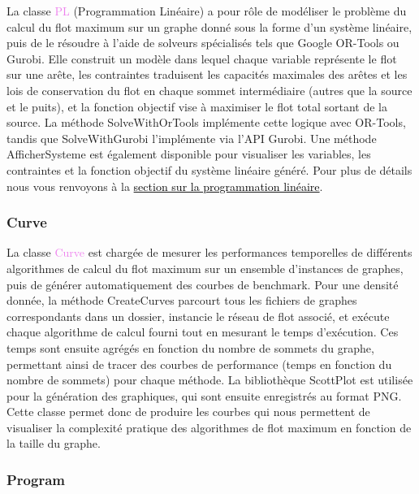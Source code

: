 \documentclass[a4paper]{article}
\begin{document}
La classe \textcolor{violet}{PL} (Programmation Linéaire) a pour rôle de modéliser le problème du calcul du flot maximum sur un graphe donné sous la forme d’un système linéaire, puis de le résoudre à l’aide de solveurs spécialisés tels que Google OR-Tools ou Gurobi. Elle construit un modèle dans lequel chaque variable représente le flot sur une arête, les contraintes traduisent les capacités maximales des arêtes et les lois de conservation du flot en chaque sommet intermédiaire (autres que la source et le puits), et la fonction objectif vise à maximiser le flot total sortant de la source. La méthode \textcolor{green!60!black}{SolveWithOrTools} implémente cette logique avec OR-Tools, tandis que \textcolor{green!60!black}{SolveWithGurobi} l’implémente via l’API Gurobi. Une méthode \textcolor{green!60!black}{AfficherSysteme} est également disponible pour visualiser les variables, les contraintes et la fonction objectif du système linéaire généré. Pour plus de détails nous vous renvoyons à la \hyperref[sec:pl]{\textcolor{black}{section sur la programmation linéaire}}.

\subsubsection{Curve}

La classe \textcolor{violet}{Curve} est chargée de mesurer les performances temporelles de différents algorithmes de calcul du flot maximum sur un ensemble d’instances de graphes, puis de générer automatiquement des courbes de benchmark. Pour une densité donnée, la méthode \textcolor{green!60!black}{CreateCurves} parcourt tous les fichiers de graphes correspondants dans un dossier, instancie le réseau de flot associé, et exécute chaque algorithme de calcul fourni tout en mesurant le temps d’exécution. Ces temps sont ensuite agrégés en fonction du nombre de sommets du graphe, permettant ainsi de tracer des courbes de performance (temps en fonction du nombre de sommets) pour chaque méthode. La bibliothèque ScottPlot est utilisée pour la génération des graphiques, qui sont ensuite enregistrés au format PNG. Cette classe permet donc de produire les courbes qui nous permettent de visualiser la complexité pratique des algorithmes de flot maximum en fonction de la taille du graphe.

\subsubsection{Program}
\end{document}
